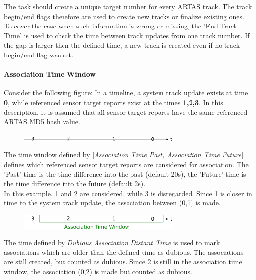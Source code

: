 The task should create a unique target number for every ARTAS track. The track begin/end flags therefore are used to create new tracks or finalize existing ones. To cover the case when such information is wrong or missing, the 'End Track Time' is used to check the time between track updates from one track number. If the gap is larger then the defined time, a new track is created even if no track begin/end flag was set.

\paragraph{Association Time Window}

Consider the following figure: In a timeline, a system track update exists at time \textbf{0}, while referenced sensor target reports exist at the times \textbf{1,2,3}. In this description, it is assumed that all sensor target reports have the same referenced ARTAS MD5 hash value.


\begin{figure}[H]
  \center
    \includegraphics[width=8cm]{figures/artas_assoc_timeline.png}
\end{figure}


The time window defined by [\textit{Association Time Past, Association Time Future}] defines which referenced sensor target reports are considered for association. The 'Past' time is the time difference into the past (default 20s), the 'Future' time is the time difference into the future (default 2s). \\

In this example, 1 and 2 are considered, while 3 is disregarded. Since 1 is closer in time to the system track update, the association between (0,1) is made.

\begin{figure}[H]
  \center
    \includegraphics[width=8cm]{figures/artas_assoc_window.png}
\end{figure}

The time defined by \textit{Dubious Association Distant Time} is used to mark associations which are older than the defined time as dubious. The associations are still created, but counted as dubious. Since 2 is still in the association time window, the association (0,2) is made but counted as dubious.

